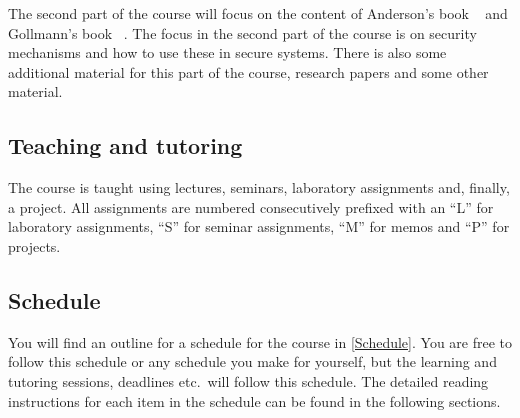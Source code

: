 The second part of the course will focus on the content of Anderson's book 
~\cite{Anderson2008sea} and Gollmann's book 
~\cite{Gollmann2011cs}.
The focus in the second part of the course is on security mechanisms and how to 
use these in secure systems.
There is also some additional material for this part of the course, \eg 
research papers and some other material.

\subsection{Teaching and tutoring}


The course is taught using lectures, seminars, laboratory assignments and, 
finally, a project.
All assignments are numbered consecutively prefixed with an \enquote{L} for 
laboratory assignments, \enquote{S} for seminar assignments, \enquote{M} for 
memos and \enquote{P} for projects.

\subsection{Schedule}

You will find an outline for a schedule for the course in \cref{Schedule}.
You are free to follow this schedule or any schedule you make for yourself, but 
the learning and tutoring sessions, deadlines etc.\ will follow this schedule.
The detailed reading instructions for each item in the schedule can be found in 
the following sections.

